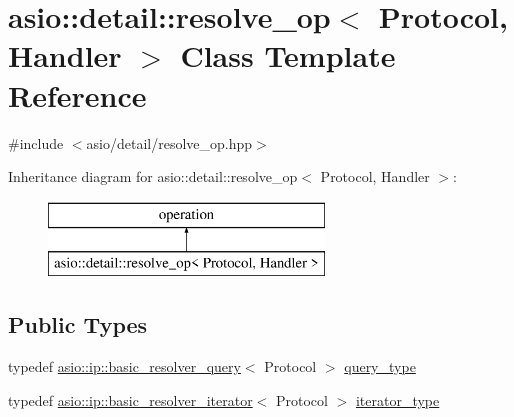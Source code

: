 \hypertarget{classasio_1_1detail_1_1resolve__op}{}\section{asio\+:\+:detail\+:\+:resolve\+\_\+op$<$ Protocol, Handler $>$ Class Template Reference}
\label{classasio_1_1detail_1_1resolve__op}


{\ttfamily \#include $<$asio/detail/resolve\+\_\+op.\+hpp$>$}

Inheritance diagram for asio\+:\+:detail\+:\+:resolve\+\_\+op$<$ Protocol, Handler $>$\+:\begin{figure}[H]
\begin{center}
\leavevmode
\includegraphics[height=2.000000cm]{classasio_1_1detail_1_1resolve__op}
\end{center}
\end{figure}
\subsection*{Public Types}
\begin{DoxyCompactItemize}
\item 
typedef \hyperlink{classasio_1_1ip_1_1basic__resolver__query}{asio\+::ip\+::basic\+\_\+resolver\+\_\+query}$<$ Protocol $>$ \hyperlink{classasio_1_1detail_1_1resolve__op_a53f417f33afa9bc3982e7d951593ca65}{query\+\_\+type}
\item 
typedef \hyperlink{classasio_1_1ip_1_1basic__resolver__iterator}{asio\+::ip\+::basic\+\_\+resolver\+\_\+iterator}$<$ Protocol $>$ \hyperlink{classasio_1_1detail_1_1resolve__op_a8fb28ab524444ef950accb0cdc144579}{iterator\+\_\+type}
\end{DoxyCompactItemize}
